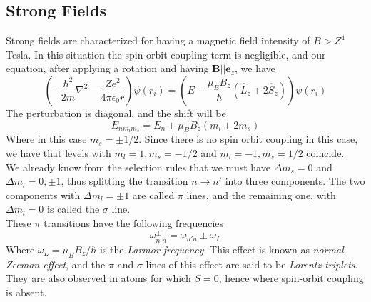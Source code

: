 \documentclass[a4paper, 11pt]{book}
\renewcommand{\vec}[1]{\mathbf{#1}}
\newcommand{\ver}[1]{\vec{e}_{#1}}
\newcommand{\1}{\opr{\mathds{1}}}
\newcommand{\opr}[1]{\hat{#1}}
\theoremstyle{plain}
\begin{document}
	\subsection{Strong Fields}
	Strong fields are characterized for having a magnetic field intensity of $B>Z^4$ Tesla. In this situation the spin-orbit coupling term is negligible, and our equation, after applying a rotation and having $\vec{B}||\ver{z}$, we have
	\begin{equation}
		\left( -\frac{\hbar^2}{2m}\nabla^2-\frac{Ze^2}{4\pi\epsilon_0r} \right)\psi(r_i)=\left( E-\frac{\mu_BB_z}{\hbar}\left( \opr{L}_z+2\opr{S}_z \right) \right)\psi(r_i)
		\label{eq:strongfieldham}
	\end{equation}
	The perturbation is diagonal, and the shift will be
	\begin{equation}
		E_{nm_lm_s}=E_n+\mu_BB_z(m_l+2m_s)
		\label{eq:energyshiftmagfield}
	\end{equation}
	Where in this case $m_s=\pm1/2$. Since there is no spin orbit coupling in this case, we have that levels with $m_l=1,m_s=-1/2$ and $m_l=-1,m_s=1/2$ coincide.\\
	We already know from the selection rules that we must have $\Delta m_s=0$ and $\Delta m_l=0,\pm1$, thus splitting the transition $n\to n'$ into three components. The two components with $\Delta m_l=\pm1$ are called $\pi$ lines, and the remaining one, with $\Delta m_l=0$ is called the $\sigma$ line.\\
	These $\pi$ transitions have the following frequencies
	\begin{equation}
		\omega^{\pm}_{n'n}=\omega_{n'n}\pm\omega_L
		\label{eq:pitranslines}
	\end{equation}
	Where $\omega_L=\mu_BB_z/\hbar$ is the \textit{Larmor frequency}. This effect is known as \textit{normal Zeeman effect}, and the $\pi$ and $\sigma$ lines of this effect are said to be \textit{Lorentz triplets}. They are also observed in atoms for which $S=0$, hence where spin-orbit coupling is absent.
\end{document}
